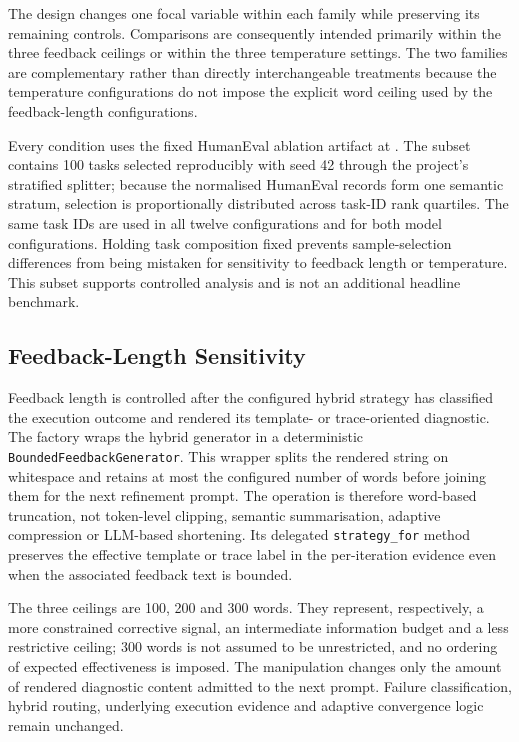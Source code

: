 The design changes one focal variable within each family while preserving its remaining controls. Comparisons are consequently intended primarily within the three feedback ceilings or within the three temperature settings. The two families are complementary rather than directly interchangeable treatments because the temperature configurations do not impose the explicit word ceiling used by the feedback-length configurations.

Every condition uses the fixed HumanEval ablation artifact at . The subset contains 100 tasks selected reproducibly with seed 42 through the project's stratified splitter; because the normalised HumanEval records form one semantic stratum, selection is proportionally distributed across task-ID rank quartiles. The same task IDs are used in all twelve configurations and for both model configurations. Holding task composition fixed prevents sample-selection differences from being mistaken for sensitivity to feedback length or temperature. This subset supports controlled analysis and is not an additional headline benchmark.

\subsection{Feedback-Length Sensitivity}

Feedback length is controlled after the configured hybrid strategy has classified the execution outcome and rendered its template- or trace-oriented diagnostic. The factory wraps the hybrid generator in a deterministic \texttt{BoundedFeedbackGenerator}. This wrapper splits the rendered string on whitespace and retains at most the configured number of words before joining them for the next refinement prompt. The operation is therefore word-based truncation, not token-level clipping, semantic summarisation, adaptive compression or LLM-based shortening. Its delegated \texttt{strategy\_for} method preserves the effective template or trace label in the per-iteration evidence even when the associated feedback text is bounded.

The three ceilings are 100, 200 and 300 words. They represent, respectively, a more constrained corrective signal, an intermediate information budget and a less restrictive ceiling; 300 words is not assumed to be unrestricted, and no ordering of expected effectiveness is imposed. The manipulation changes only the amount of rendered diagnostic content admitted to the next prompt. Failure classification, hybrid routing, underlying execution evidence and adaptive convergence logic remain unchanged.

